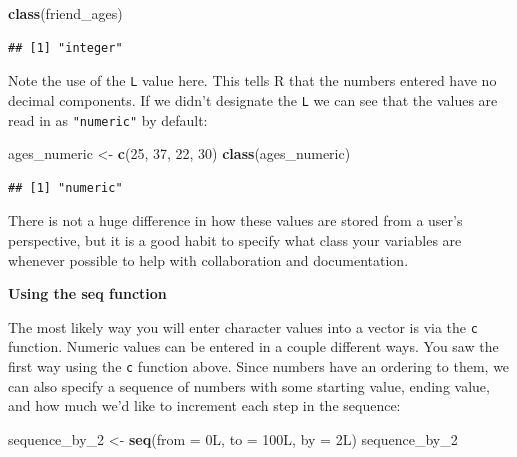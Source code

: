 \documentclass[]{tufte-book}
\newenvironment{Shaded}{\begin{snugshade}}{\end{snugshade}}
\newcommand{\KeywordTok}[1]{\textcolor[rgb]{0.13,0.29,0.53}{\textbf{{#1}}}}
\newcommand{\DataTypeTok}[1]{\textcolor[rgb]{0.13,0.29,0.53}{{#1}}}
\newcommand{\DecValTok}[1]{\textcolor[rgb]{0.00,0.00,0.81}{{#1}}}
\newcommand{\StringTok}[1]{\textcolor[rgb]{0.31,0.60,0.02}{{#1}}}
\newcommand{\NormalTok}[1]{{#1}}
\begin{document}
\begin{Shaded}
\begin{Highlighting}[]
\KeywordTok{class}\NormalTok{(friend_ages)}
\end{Highlighting}
\end{Shaded}

\begin{verbatim}
## [1] "integer"
\end{verbatim}

Note the use of the \texttt{L} value here. This tells R that the numbers
entered have no decimal components. If we didn't designate the
\texttt{L} we can see that the values are read in as \texttt{"numeric"}
by default:

\begin{Shaded}
\begin{Highlighting}[]
\NormalTok{ages_numeric <-}\StringTok{ }\KeywordTok{c}\NormalTok{(}\DecValTok{25}\NormalTok{, }\DecValTok{37}\NormalTok{, }\DecValTok{22}\NormalTok{, }\DecValTok{30}\NormalTok{)}
\KeywordTok{class}\NormalTok{(ages_numeric)}
\end{Highlighting}
\end{Shaded}

\begin{verbatim}
## [1] "numeric"
\end{verbatim}

There is not a huge difference in how these values are stored from a
user's perspective, but it is a good habit to specify what class your
variables are whenever possible to help with collaboration and
documentation. \newline

\vspace*{0.2in}

\noindent\textbf{Using the seq function}\vspace*{0.1in}

The most likely way you will enter character values into a vector is via
the \texttt{c} function. Numeric values can be entered in a couple
different ways. You saw the first way using the \texttt{c} function
above. Since numbers have an ordering to them, we can also specify a
sequence of numbers with some starting value, ending value, and how much
we'd like to increment each step in the sequence:

\begin{Shaded}
\begin{Highlighting}[]
\NormalTok{sequence_by_2 <-}\StringTok{ }\KeywordTok{seq}\NormalTok{(}\DataTypeTok{from =} \NormalTok{0L, }\DataTypeTok{to =} \NormalTok{100L, }\DataTypeTok{by =} \NormalTok{2L)}
\NormalTok{sequence_by_2}
\end{Highlighting}
\end{Shaded}
\end{document}
